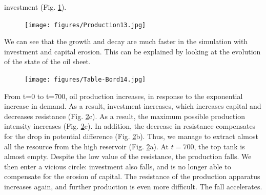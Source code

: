 \documentclass[12pt,a4paper]{article}%
\begin{document}
\begin{appendix}
investment (Fig. \ref{Fig13}).  \begin{figure}[h] \incentering \texttt{[image: figures/Production13.jpg]}\label{Fig13}\end{figure} We can see that the growth and decay are much faster in the simulation with investment and capital erosion. This can be explained by looking at the evolution of the state of the oil sheet.  \begin{figure}[h] \incentering \texttt{[image: figures/Table-Bord14.jpg]}\label{Fig14}\end{figure} From t=0 to t=700, oil production increases, in response to the exponential increase in demand. As a result, investment increases, which increases capital and decreases resistance (Fig. \ref{Fig14}c). As a result, the maximum possible production intensity increases (Fig. \ref{Fig14}e). In addition, the decrease in resistance compensates for the drop in potential difference (Fig. \ref{Fig14}b). Thus, we manage to extract almost all the resource from the high reservoir (Fig. \ref{Fig14}a). At $t=700$, the top tank is almost empty. Despite the low value of the resistance, the production falls.  We then enter a vicious circle: investment also falls, and is no longer able to compensate for the erosion of capital. The resistance of the production apparatus increases again, and further production is even more difficult. The fall accelerates.
 
\end{appendix}
\end{document}
